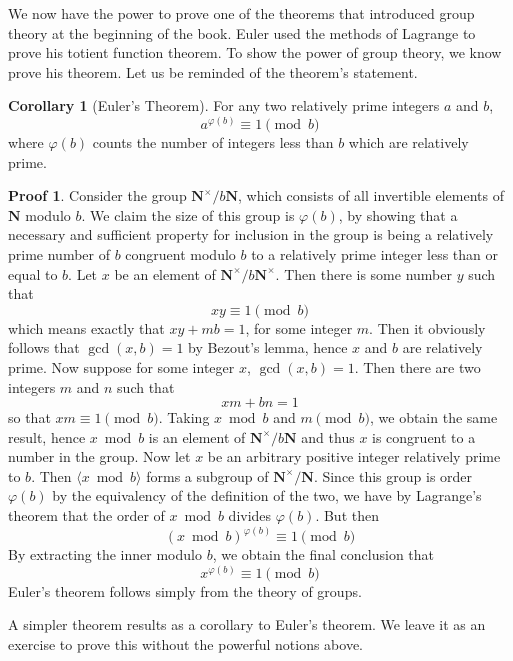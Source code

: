 \documentclass[12pt]{amsbook}
\theoremstyle{definition}
\newtheorem{corollary}[theorem]{Corollary}
\newtheorem*{prf}{Proof}
\newcommand{\gen}[1]{\langle #1 \rangle} %
\begin{document}
We now have the power to prove one of the theorems that introduced group theory at the beginning of the book. Euler used the methods of Lagrange to prove his totient function theorem. To show the power of group theory, we know prove his theorem. Let us be reminded of the theorem's statement.

\begin{corollary}[Euler's Theorem] 
    For any two relatively prime integers $a$ and $b$,
    \[ a^{\varphi(b)} \equiv 1 \pmod{b} \]
    where $\varphi(b)$ counts the number of integers less than $b$ which are relatively prime.
\end{corollary}
\begin{prf}
    Consider the group $\mathbf{N}^\times/b\mathbf{N}$, which consists of all invertible elements of $\mathbf{N}$ modulo $b$. We claim the size of this group is $\varphi(b)$, by showing that a necessary and sufficient property for inclusion in the group is being a relatively prime number of $b$ congruent modulo $b$ to a relatively prime integer less than or equal to $b$. Let $x$ be an element of $\mathbf{N}^\times/b\mathbf{N}^\times$. Then there is some number $y$ such that
    \[ xy \equiv 1 \pmod{b} \]
    which means exactly that $xy + mb = 1$, for some integer $m$. Then it obviously follows that $\gcd(x,b) = 1$ by Bezout's lemma, hence $x$ and $b$ are relatively prime. Now suppose for some integer $x$, $\gcd(x,b) = 1$. Then there are two integers $m$ and $n$ such that
    \[ xm + bn = 1 \]
    so that $xm \equiv 1 \pmod{b}$. Taking $x \bmod b$ and $m \pmod{b}$, we obtain the same result, hence $x \bmod b$ is an element of $\mathbf{N}^\times/b\mathbf{N}$ and thus $x$ is congruent to a number in the group. Now let $x$ be an arbitrary positive integer relatively prime to $b$. Then $\gen{x \bmod b}$ forms a subgroup of $\mathbf{N}^\times/\mathbf{N}$. Since this group is order $\varphi(b)$ by the equivalency of the definition of the two, we have by Lagrange's theorem that the order of $x \bmod b$ divides $\varphi(b)$. But then
    \[ (x \bmod b)^{\varphi(b)} \equiv 1 \pmod{b} \]
    By extracting the inner modulo $b$, we obtain the final conclusion that
    \[ x^{\varphi(b)} \equiv 1 \pmod{b} \]
    Euler's theorem follows simply from the theory of groups.
\end{prf}

A simpler theorem results as a corollary to Euler's theorem. We leave it as an exercise to prove this without the powerful notions above.
\end{document}

